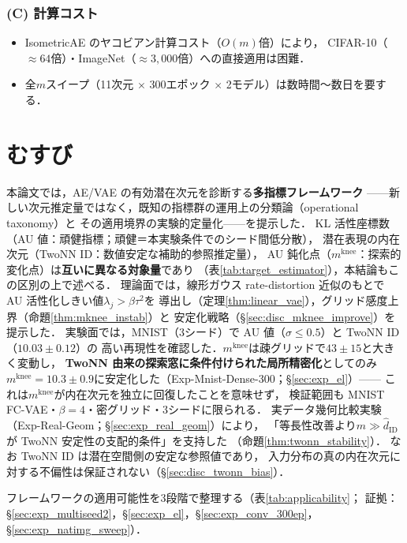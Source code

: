 \documentclass[11pt,a4paper]{jsarticle}
\newcommand{\mknee}{m^{\mathrm{knee}}}
\begin{document}
\subsubsection*{(C) 計算コスト}

\begin{itemize}
  \item IsometricAE のヤコビアン計算コスト（$O(m)$倍）により，
        CIFAR-10（$\approx 64$倍）・ImageNet（$\approx 3{,}000$倍）への直接適用は困難．
  \item 全$m$スイープ（11次元 $\times$ 300エポック $\times$ 2モデル）は数時間〜数日を要する．
\end{itemize}

\section{むすび}\label{sec:conclusion}

本論文では，AE/VAE の有効潜在次元を診断する\textbf{多指標フレームワーク}
——新しい次元推定量ではなく，既知の指標群の運用上の分類論（operational taxonomy）と
その適用境界の実験的定量化——を提示した．
KL 活性座標数（AU 値：頑健指標；頑健＝本実験条件でのシード間低分散），
潜在表現の内在次元（TwoNN ID：数値安定な補助的参照推定量），
AU 鈍化点（$\mknee$：探索的変化点）は\textbf{互いに異なる対象量}であり
（表\ref{tab:target_estimator}），本結論もこの区別の上で述べる．
理論面では，線形ガウス rate-distortion 近似のもとで AU 活性化しきい値$\lambda_j > \beta\tau^2$を
導出し（定理\ref{thm:linear_vae}），グリッド感度上界（命題\ref{thm:mknee_instab}）と
安定化戦略（§\ref{sec:disc_mknee_improve}）を提示した．
実験面では，MNIST（3シード）で AU 値（$\sigma \leq 0.5$）と TwoNN ID（$10.03 \pm 0.12$）の
高い再現性を確認した．$\mknee$は疎グリッドで$43 \pm 15$と大きく変動し，
\textbf{TwoNN 由来の探索窓に条件付けられた局所精密化}としてのみ
$\mknee = 10.3 \pm 0.9$に安定化した（Exp-Mnist-Dense-300；§\ref{sec:exp_el}）——
これは$\mknee$が内在次元を独立に回復したことを意味せず，
検証範囲も MNIST FC-VAE・$\beta = 4$・密グリッド・3シードに限られる．
実データ幾何比較実験（Exp-Real-Geom；§\ref{sec:exp_real_geom}）により，
「等長性改善より$m \gg \hat{d}_\mathrm{ID}$が TwoNN 安定性の支配的条件」を支持した
（命題\ref{thm:twonn_stability}）．
なお TwoNN ID は潜在空間側の安定な参照値であり，
入力分布の真の内在次元に対する不偏性は保証されない（§\ref{sec:disc_twonn_bias}）．

フレームワークの適用可能性を3段階で整理する（表\ref{tab:applicability}；
証拠：§\ref{sec:exp_multiseed2}，§\ref{sec:exp_el}，§\ref{sec:exp_conv_300ep}，§\ref{sec:exp_natimg_sweep}）．
\end{document}
